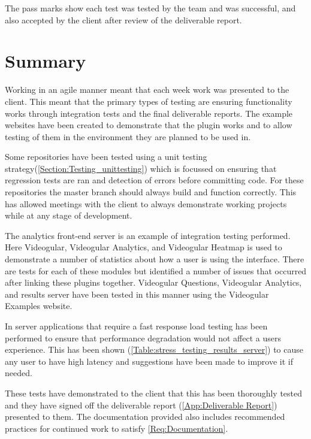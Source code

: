 The pass marks show each test was tested by the team and was successful, and also accepted by the client after review of the deliverable report.

\section{Summary}

Working in an agile manner meant that each week work was presented to the client. This meant that the primary types of testing are ensuring functionality works through integration tests and the final deliverable reports. The example websites have been created to demonstrate that the plugin works and to allow testing of them in the environment they are planned to be used in.

Some repositories have been tested using a unit testing strategy(\autoref{Section:Testing_unittesting}) which is focussed on ensuring that regression tests are ran and detection of errors before committing code. For these repositories the master branch should always build and function correctly. This has allowed meetings with the client to always demonstrate working projects while at any stage of development.

The analytics front-end server is an example of integration testing performed. Here \gls{Videogular}, Videogular Analytics, and Videogular Heatmap is used to demonstrate a number of statistics about how a user is using the interface. There are tests for each of these modules but identified a number of issues that occurred after linking these plugins together. Videogular Questions, Videogular Analytics, and results server have been tested in this manner using the Videogular Examples website.

In server applications that require a fast response load testing has been performed to ensure that performance degradation would not affect a users experience. This has been shown (\autoref{Table:stress_testing_results_server}) to cause any user to have high latency and suggestions have been made to improve it if needed.

These tests have demonstrated to the client that this has been thoroughly tested and they have signed off the deliverable report (\cref{App:Deliverable Report}) presented to them. The documentation provided also includes recommended practices for continued work to satisfy \cref{Req:Documentation}.